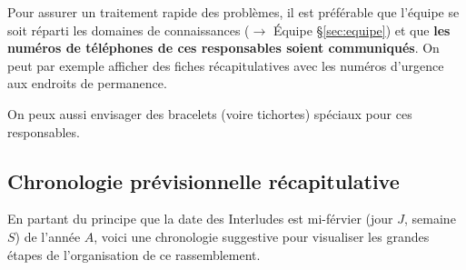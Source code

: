 \begin{Aanticiper}{}{}
Pour assurer un traitement rapide des problèmes, il est préférable que l'équipe se soit réparti les domaines de connaissances ($\to$ Équipe \S\ref{sec:equipe}) et que \textbf{les numéros de téléphones de ces responsables soient communiqués}. On peut par exemple afficher des fiches récapitulatives avec les numéros d'urgence aux endroits de permanence.
\end{Aanticiper}

On peux aussi envisager des bracelets (voire tichortes) spéciaux pour ces responsables.

\subsection{Chronologie prévisionnelle récapitulative}

En partant du principe que la date des Interludes est mi-férvier (jour $J$, semaine $S$) de l'année $A$, voici une chronologie suggestive pour visualiser les grandes étapes de l'organisation de ce rassemblement.

\hspace*{\fill}
\hspace*{\fill}

